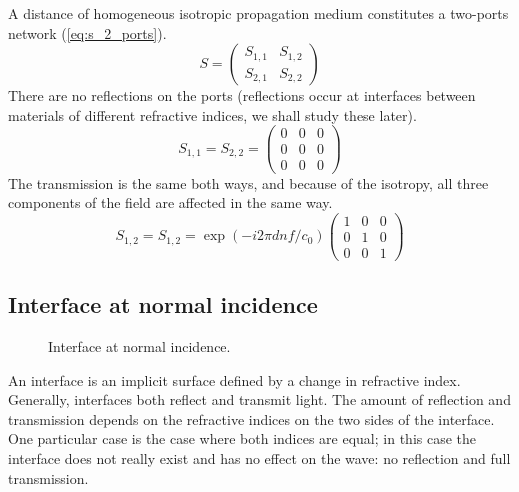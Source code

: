 A distance of homogeneous isotropic propagation medium constitutes a two-ports network (\cref{eq:s_2_ports}).
\begin{equation}
    S =
    \begin{pmatrix}
        S_{1, 1} & S_{1, 2} \\
        S_{2, 1} & S_{2, 2}
    \end{pmatrix}
    \label{eq:s_2_ports}
\end{equation}
There are no reflections on the ports (reflections occur at interfaces between materials of different refractive indices, we shall study these later).
\begin{equation}
    S_{1, 1} = S_{2, 2} =
    \begin{pmatrix}
        0 & 0 & 0 \\
        0 & 0 & 0 \\
        0 & 0 & 0
    \end{pmatrix}
\end{equation}
The transmission is the same both ways, and because of the isotropy, all three components of the field are affected in the same way.
\begin{equation}
    S_{1, 2} = S_{1, 2} =
    \exp(- i 2\pi d n f / c_0)
    \begin{pmatrix}
        1 & 0 & 0 \\
        0 & 1 & 0 \\
        0 & 0 & 1
    \end{pmatrix}
\end{equation}



\subsection{Interface at normal incidence}
\label{sec:interface_at_normal_incidence}

\begin{figure}[hbtp]
    \centering
    \caption{\label{fig:net_interface_normal}Interface at normal incidence.}
\end{figure}
An interface is an implicit surface defined by a change in refractive index.
Generally, interfaces both reflect and transmit light.
The amount of reflection and transmission depends on the refractive indices on the two sides of the interface.
One particular case is the case where both indices are equal; in this case the interface does not really exist and has no effect on the wave: no reflection and full transmission.


